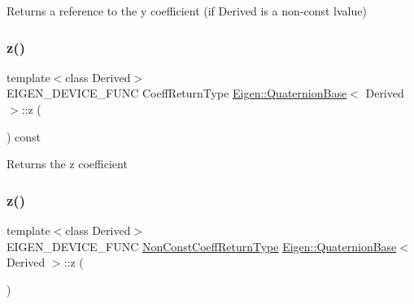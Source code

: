 \begin{DoxyReturn}{Returns}
a reference to the {\ttfamily y} coefficient (if Derived is a non-\/const lvalue) 
\end{DoxyReturn}
\mbox{\label{class_eigen_1_1_quaternion_base_af76afdeb1d1441cbf09d4989437a930e}} 
\subsubsection{\texorpdfstring{z()}{z()}\hspace{0.1cm}{\footnotesize\ttfamily [1/2]}}
{\footnotesize\ttfamily template$<$class Derived$>$ \\
E\+I\+G\+E\+N\+\_\+\+D\+E\+V\+I\+C\+E\+\_\+\+F\+U\+NC Coeff\+Return\+Type \mbox{\hyperlink{class_eigen_1_1_quaternion_base}{Eigen\+::\+Quaternion\+Base}}$<$ Derived $>$\+::z (\begin{DoxyParamCaption}{ }\end{DoxyParamCaption}) const\hspace{0.3cm}{\ttfamily [inline]}}

\begin{DoxyReturn}{Returns}
the {\ttfamily z} coefficient 
\end{DoxyReturn}
\mbox{\label{class_eigen_1_1_quaternion_base_a39397e0e9fa7e0a02512fc3f50c95542}} 
\subsubsection{\texorpdfstring{z()}{z()}\hspace{0.1cm}{\footnotesize\ttfamily [2/2]}}
{\footnotesize\ttfamily template$<$class Derived$>$ \\
E\+I\+G\+E\+N\+\_\+\+D\+E\+V\+I\+C\+E\+\_\+\+F\+U\+NC \mbox{\hyperlink{struct_eigen_1_1internal_1_1true__type}{Non\+Const\+Coeff\+Return\+Type}} \mbox{\hyperlink{class_eigen_1_1_quaternion_base}{Eigen\+::\+Quaternion\+Base}}$<$ Derived $>$\+::z (\begin{DoxyParamCaption}{ }\end{DoxyParamCaption})\hspace{0.3cm}{\ttfamily [inline]}}


